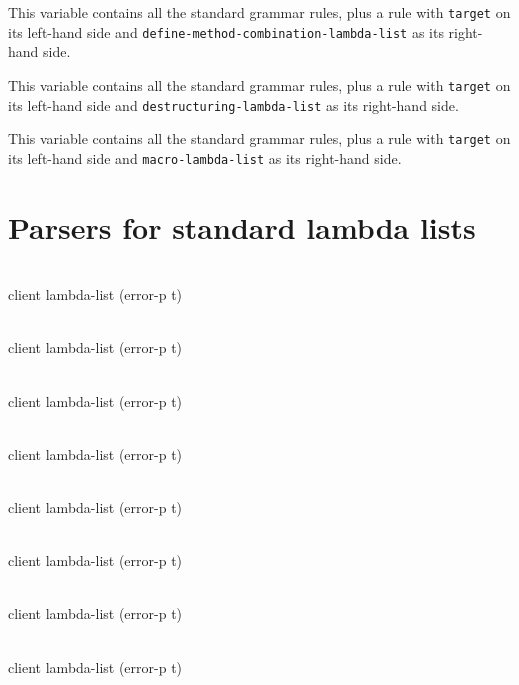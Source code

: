 
This variable contains all the standard grammar rules, plus a rule
with \texttt{target} on its left-hand side and
\texttt{define-method-combination-lambda-list} as its right-hand side.


This variable contains all the standard grammar rules, plus a rule
with \texttt{target} on its left-hand side and
\texttt{destructuring-lambda-list} as its right-hand side.


This variable contains all the standard grammar rules, plus a rule
with \texttt{target} on its left-hand side and
\texttt{macro-lambda-list} as its right-hand side.

\section{Parsers for standard lambda lists}

\\
{client lambda-list \key (error-p t)}

\\
{client lambda-list \key (error-p t)}

\\
{client lambda-list \key (error-p t)}

\\
{client lambda-list \key (error-p t)}

\\
{client lambda-list \key (error-p t)}

\\
{client lambda-list \key (error-p t)}

\\
{client lambda-list \key (error-p t)}

\\
{client lambda-list \key (error-p t)}

